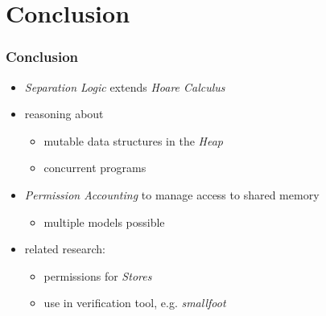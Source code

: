 \documentclass{beamer}
\begin{document}
	\section{Conclusion}
	\begin{frame}
	\frametitle{Conclusion}
	\begin{itemize}
		\item \emph{Separation Logic} extends \emph{Hoare Calculus}
		\item reasoning about
		\begin{itemize}
			\item mutable data structures in the \emph{Heap}
			\item concurrent programs
		\end{itemize}
		\item \emph{Permission Accounting} to manage access to shared memory
		\begin{itemize}
			\item multiple models possible
		\end{itemize}
		\item related research:
		\begin{itemize}
			\item permissions for \emph{Stores}
			\item use in verification tool, e.g. \emph{smallfoot}
		\end{itemize}
	\end{itemize}
	\end{frame}
\end{document}
